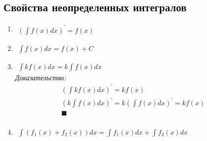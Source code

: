 \documentclass[12pt, fleqn]{book}
\begin{document}
	\subsection{Свойства неопределенных интегралов}
	\begin{enumerate}[1)]
		\item $\begin{gathered}
		 	\left(\int f(x)dx\right)^\prime=f(x)
		 \end{gathered}$
		\item 
		$\begin{gathered}
			\int f(x)dx=f(x) + C
		\end{gathered}$
		\item 
	$	\begin{gathered}
			\int kf(x)dx=k\int f(x)dx
		\end{gathered}$\\
		\textit{Доказательство:}
		\begin{multline*}
			\left(\int kf(x)dx\right)^\prime=kf(x)\\
			\left(k\int f(x)dx\right)^\prime=k\left(\int f(x) dx\right)^\prime=kf(x)\\
			\blacksquare\\
		\end{multline*}
		\item $\begin{gathered}
			\int \left(f_1(x) + f_2(x)\right)dx = \int f_1(x) dx + \int f_2(x) dx
		\end{gathered}$
	\end{enumerate}
\end{document}
